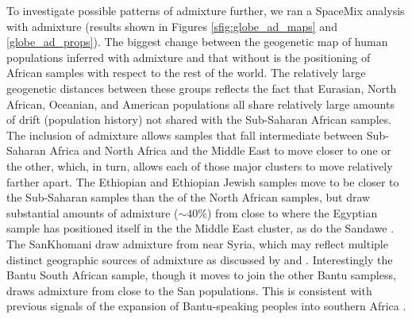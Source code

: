 \documentclass[12pt]{article}
\begin{document}
To investigate possible patterns of admixture further, we ran a SpaceMix analysis with admixture (results shown in Figures \ref{sfig:globe_ad_maps} and \ref{globe_ad_props}). The biggest change between the geogenetic map of human populations inferred with admixture and that without is the positioning of African samples with respect to the rest of the world.  The relatively large geogenetic distances between these groups reflects the fact that Eurasian, North African, Oceanian, and American populations all share relatively large amounts of drift (population history) not shared with the Sub-Saharan African samples. The inclusion of admixture allows samples that fall intermediate between Sub-Saharan Africa and North Africa and the Middle East to move closer to one or the other, which, in turn, allows each of those major clusters to move relatively farther apart.  The Ethiopian and Ethiopian Jewish samples move to be closer to the Sub-Saharan samples than the of the North African samples, but draw substantial amounts of admixture ($\sim 40\%$) from close to where the Egyptian sample has positioned itself in the the Middle East cluster, as do the Sandawe \citep{hodgson_early_2014,Pickrell:12}. The SanKhomani draw admixture from near Syria, which may reflect multiple distinct geographic sources of admixture as discussed by \citep{Hellenthal} and \citep{Pickrell:14}. 
Interestingly the Bantu South African sample, though it moves to join the other Bantu sampless, draws admixture from close to the San populations. This is consistent with previous signals of the expansion of Bantu-speaking peoples into southern Africa  \citep{Pickrell:12,Jakobsson_genomic_2012,Pickrell:14,Hellenthal}. 
\end{document}
